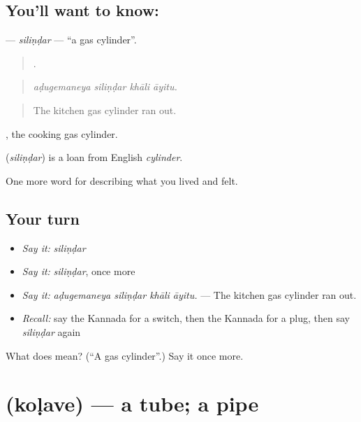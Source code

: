 \subsection*{You'll want to know: }
\textbf{} — \emph{siliṇḍar} — \textquotedblleft{}a gas cylinder\textquotedblright{}.

\begin{quote}
   .
\end{quote}

\begin{quote}
\emph{aḍugemaneya siliṇḍar khāli āyitu.}
\end{quote}

\begin{quote}
The kitchen gas cylinder ran out.
\end{quote}

 , the cooking gas cylinder.

\begin{cousinweb}
\textbf{} (\emph{siliṇḍar}) is a loan from English \emph{cylinder}.
\end{cousinweb}

\begin{grammarlens}[title={What you've built}]
One more word for describing what you lived and felt.
\end{grammarlens}

\subsection*{Your turn}
\begin{itemize}
\raggedright
  \item \emph{Say it:} \emph{siliṇḍar}
  \item \emph{Say it:} \emph{siliṇḍar}, once more
  \item \emph{Say it:} \emph{aḍugemaneya siliṇḍar khāli āyitu.} — The kitchen gas cylinder ran out.
  \item \emph{Recall:} say the Kannada for a switch, then the Kannada for a plug, then say \emph{siliṇḍar} again
\end{itemize}

\begin{tcolorbox}[breakable,colback=teal!4,colframe=teal!35!black,title={Before you move on}]
What does  mean? (\textquotedblleft{}A gas cylinder\textquotedblright{}.) Say it once more.
\end{tcolorbox}
\section[\texorpdfstring{\kn{ಕೊಳವೆ} (koḷave)}{ಕೊಳವೆ (koḷave)}]{ (koḷave) — a tube; a pipe}

